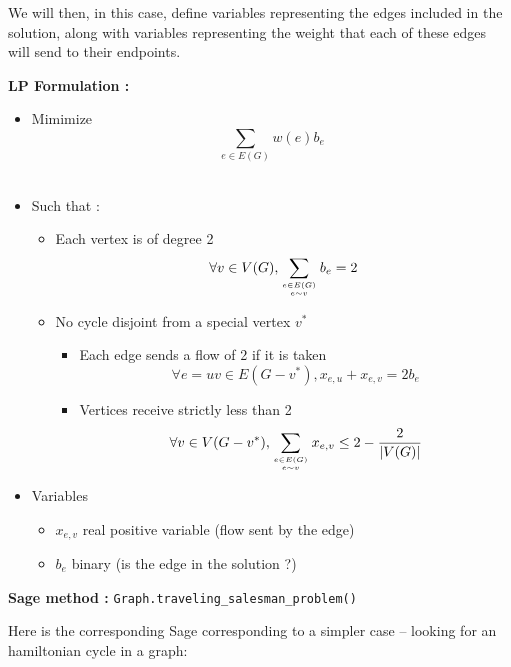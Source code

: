 We will then, in this case, define variables representing the edges included in the solution, along with variables representing the weight that each of these edges will send to their endpoints.

{\bf LP Formulation :}
\begin{itemize}
\item Mimimize $$\sum_{e\in E(G)}w(e) b_e$$\\
\item Such that :
  \begin{itemize}
  \item Each vertex is of degree 2
    $$\forall v\in V(G), \sum_{e\in E(G)\atop e\sim v}b_e = 2$$
  \item No cycle disjoint from a special vertex $v^*$
    \begin{itemize}
    \item Each edge sends a flow of 2 if it is taken
      $$\forall e=uv\in E(G-v^*), x_{e,u} + x_{e,v} = 2b_e$$
    \item Vertices receive strictly less than 2
      $$\forall v\in V(G-v^*), \sum_{e\in E(G)\atop e\sim v}x_{e,v}\leq 2-\frac 2 {|V(G)|}$$
    \end{itemize}

  \end{itemize}
\item Variables
  \begin{itemize}
  \item $x_{e,v}$ real positive variable (flow sent by the edge)
  \item $b_e$ binary (is the edge in the solution ?)

  \end{itemize}
\end{itemize}

{\bf Sage method : }\verb!Graph.traveling_salesman_problem()!

Here is the corresponding Sage corresponding to a simpler case -- looking for an hamiltonian cycle in a graph:

